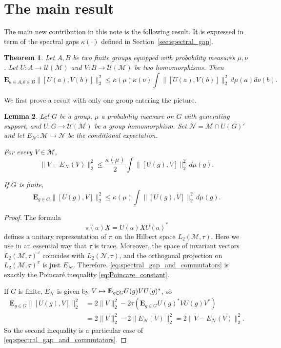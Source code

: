 \documentclass[JEP,XML,SOM,Unicode,published]{cedram}
\newcommand\mto{\mathchoice{\longmapsto}{\mapsto}{\mapsto}{\mapsto}}
\theoremstyle{plain}
\newtheorem{theorem}{Theorem}[section]
\newtheorem{lemma}[theorem]{Lemma}
\theoremstyle{definition}
\newcommand{\cM}{\mathcal{M}}
\newcommand{\cN}{\mathcal{N}}
\newcommand{\E}{\mathbf{E}}
\newcommand{\cU}{\mathcal{U}}
\begin{document}
\section{The main result}\label{sec:main}
The main new contribution in this note is the following result. It is expressed in term of the spectral gaps $\kappa(\cdot)$ defined in Section~\ref{sec:spectral_gap}.

\begin{theorem}\label{thm:almost_commutation}
Let $A,B$ be two finite groups equipped with probability measures $\mu,\nu$.
Let $U:A \to \cU(\cM)$ and $V:B \to \cU(\cM)$ be two homomorphisms. Then
\[
\E_{a \in A,b\in B} \| [U(a),V(b)]\|_2^2 \leq \kappa(\mu)\kappa(\nu) \int \| [U(a),V(b)]\|_2^2 \,d\mu(a) d\nu(b).
\]
\end{theorem}

We first prove a result with only one group entering the picture.
\begin{lemma}\label{lemma:spectral_gap_commutator} Let $G$ be a group, $\mu$ a probability measure on $G$ with generating support, and $U\colon G\to \cU(\cM)$ be a group homomorphism. Set $\cN=\cM \cap U(G)'$ and let \hbox{$E_\cN:\cM\to\cN$} be the conditional expectation.

For every $V \in \cM$,
\begin{equation}\label{eq:spectral_gap_and_commutators} \| V - E_\cN(V)\|_2^2 \leq \frac{\kappa(\mu)}{2} \int \|[U(g),V]\|_2^2 \,d\mu(g).
\end{equation}

If $G$ is finite,
\[
\E_{g \in G} \|[U(g),V]\|_2^2 \leq \kappa(\mu) \int \|[U(g),V]\|_2^2 \,d\mu(g).
\]
\end{lemma}
\begin{proof} The formula
\[
\pi(a) X = U(a) X U(a)^*
\]
defines a unitary representation of $\pi$ on the Hilbert space $L_2(\cM,\tau)$. Here we use in an essential way that $\tau$ is trace. Moreover, the space of invariant vectors $L_2(\cM,\tau)^\pi$ coincides with $L_2(\cN,\tau)$, and the orthogonal projection on $L_2(\cM,\tau)^\pi$ is just $E_\cN$. Therefore, \eqref{eq:spectral_gap_and_commutators} is exactly the Poincaré inequality \eqref{eq:Poincare_constant}.

If $G$ is finite, $E_\cN$ is given by $V\mto \E_{g\in G} U(g) V U(g)^*$, so
\begin{align*} \E_{g \in G} \|[U(g),V]\|_2^2 &= 2\|V\|_2^2-2\tau(\E_{g \in G} U(g)^* V U(g)V^*)\\& = 2\|V\|_2^2-2\|E_\cN(V)\|_2^2 = 2\|V-E_\cN(V)\|_2^2.
\end{align*}
So the second inequality is a particular case of \eqref{eq:spectral_gap_and_commutators}.
\end{proof}
\end{document}
